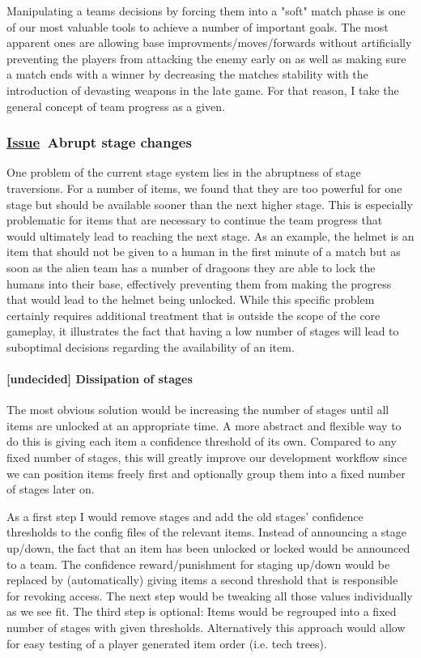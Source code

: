 \documentclass{scrartcl}
\newcommand{\issue}    [0]{\textbf{\underline{Issue}\ }}
\newcommand{\undecided}[0]{\textcolor{undecided}{\textbf{[undecided] }}}
\begin{document}
Manipulating a teams decisions by forcing them into a "soft" match phase is one of our most valuable tools to achieve a number of important goals. The most apparent ones are allowing base improvments/moves/forwards without artificially preventing the players from attacking the enemy early on as well as making sure a match ends with a winner by decreasing the matches stability with the introduction of devasting weapons in the late game. For that reason, I take the general concept of team progress as a given.

\subsubsection{\issue Abrupt stage changes}

One problem of the current stage system lies in the abruptness of stage traversions. For a number of items, we found that they are too powerful for one stage but should be available sooner than the next higher stage. This is especially problematic for items that are necessary to continue the team progress that would ultimately lead to reaching the next stage. As an example, the helmet is an item that should not be given to a human in the first minute of a match but as soon as the alien team has a number of dragoons they are able to lock the humans into their base, effectively preventing them from making the progress that would lead to the helmet being unlocked. While this specific problem certainly requires additional treatment that is outside the scope of the core gameplay, it illustrates the fact that having a low number of stages will lead to suboptimal decisions regarding the availability of an item.

\paragraph{\undecided Dissipation of stages}

The most obvious solution would be increasing the number of stages until all items are unlocked at an appropriate time. A more abstract and flexible way to do this is giving each item a confidence threshold of its own. Compared to  any fixed number of stages, this will greatly improve our development workflow since we can position items freely first and optionally group them into a fixed number of stages later on.

As a first step I would remove stages and add the old stages' confidence thresholds to the config files of the relevant items. Instead of announcing a stage up/down, the fact that an item has been unlocked or locked would be announced to a team. The confidence reward/punishment for staging up/down would be replaced by (automatically) giving items a second threshold that is responsible for revoking access. The next step would be tweaking all those values individually as we see fit. The third step is optional: Items would be regrouped into a fixed number of stages with given thresholds. Alternatively this approach would allow for easy testing of a player generated item order (i.e. tech trees).
\end{document}

